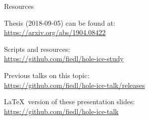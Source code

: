 
\begin{frame}{Resources}
  \begin{center}
    Thesis (2018-09-05) can be found at: \\ \vspace{0.2cm}
    \url{https://arxiv.org/abs/1904.08422}

    \vspace{1cm}

    Scripts and resources: \\ \vspace{0.2cm}
    \url{https://github.com/fiedl/hole-ice-study}

    \vspace{1cm}

    Previous talks on this topic: \\ \vspace{0.2cm}
    \url{https://github.com/fiedl/hole-ice-talk/releases}

    \vspace{1cm}

    \LaTeX\ version of these presentation slides: \\ \vspace{0.2cm}
    \url{https://github.com/fiedl/hole-ice-talk}
  \end{center}
\end{frame}

